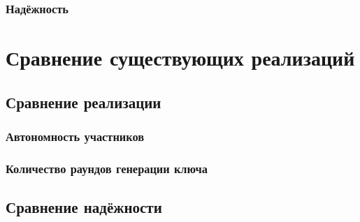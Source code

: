 \subsection{Надёжность}
\chapter{Сравнение существующих реализаций}
\section{Сравнение реализации}
\subsection{Автономность участников}
\subsection{Количество раундов генерации ключа}
\section{Сравнение надёжности}